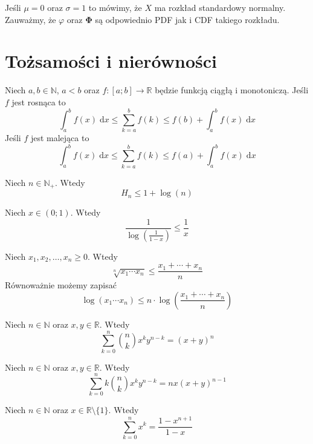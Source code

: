 Jeśli $\mu = 0$ oraz $\sigma = 1$ to mówimy, że $X$ ma rozkład standardowy normalny. Zauważmy, że $\varphi$ oraz $\mathbf{\Phi}$ są odpowiednio PDF jak i CDF takiego rozkładu.

\section{Tożsamości i nierówności}

\begin{fact}\label{F:approximation_of_sum_by_an_integral}
Niech $a,b\in\mathbb{N}$, $a<b$ oraz $f:[a;b]\to\mathbb{R}$ będzie funkcją ciągłą i monotoniczą.
Jeśli $f$ jest rosnąca to
\[
    \int_{a}^b f(x)\; \mathrm{d}x \le \sum_{k=a}^{b} f(k)\le f(b) + \int_{a}^b f(x)\; \mathrm{d}x
\]
Jeśli $f$ jest malejąca to 
\[
    \int_{a}^b f(x)\; \mathrm{d}x \le \sum_{k=a}^{b} f(k)\le f(a) + \int_{a}^b f(x)\; \mathrm{d}x
\]
\end{fact}

\begin{fact}\label{F:harmonic_upper_bound}
Niech $n\in\mathbb{N}_+$. Wtedy
\[
    H_n \le 1 + \log(n)
\]
\end{fact}

\begin{fact}\label{F:log_vs_x}
Niech $x \in (0;1)$. Wtedy
\[
    \frac{1}{\log(\frac{1}{1-x})} \le \frac{1}{x}
\]
\end{fact}

\begin{fact}\label{F:AM_GM}
Niech $x_1,x_2,\dots,x_n\ge 0$. Wtedy
\[
    \sqrt[n]{x_1\cdots x_n} \le \frac{x_1  + \cdots + x_n}{n}
\]
Równoważnie możemy zapisać
\[
    \log(x_1\cdots x_n) \le n\cdot \log\left(\frac{x_1 + \cdots + x_n}{n}\right)
\]
\end{fact}

\begin{fact}\label{F:binomial_0}
Niech $n\in\mathbb{N}$ oraz $x,y\in\mathbb{R}$. Wtedy
\[
    \sum_{k=0}^{n} \binom{n}{k} x^k y^{n-k}= (x+y)^n
\]
\end{fact}

\begin{fact}\label{F:binomial_1}
Niech $n\in\mathbb{N}$ oraz $x,y\in\mathbb{R}$. Wtedy
\[
    \sum_{k=0}^{n} k\binom{n}{k} x^k y^{n-k} = nx(x+y)^{n-1}
\]
\end{fact}

\begin{fact}\label{F:geo_0}
Niech $n\in\mathbb{N}$ oraz $x\in\mathbb{R}\setminus\{1\}$. Wtedy
\[
    \sum_{k=0}^{n} x^k = \frac{1-x^{n+1}}{1-x}
\]
\end{fact}

